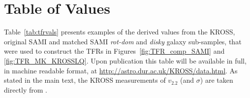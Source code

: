 \documentclass[a4paper,fleqn,usenatbib]{mnras}
\begin{document}
{%










\appendix

\section{Table of Values}

Table~\ref{tab:tfrvals} presents examples of the derived values from the KROSS, original SAMI and matched SAMI \textit{rot-dom} and \textit{disky} galaxy sub-samples, that were used to construct the TFRs in Figures~\ref{fig:TFR_comp_SAMI} and \ref{fig:TFR_MK_KROSSLQ}. Upon publication this table will be available in full, in machine readable format, at \url{http://astro.dur.ac.uk/KROSS/data.html}. As stated in the main text, the KROSS measurements of $v_{2.2}$ (and $\sigma$) are taken directly from \citet{Harrison:2017}.


}
\end{document}
